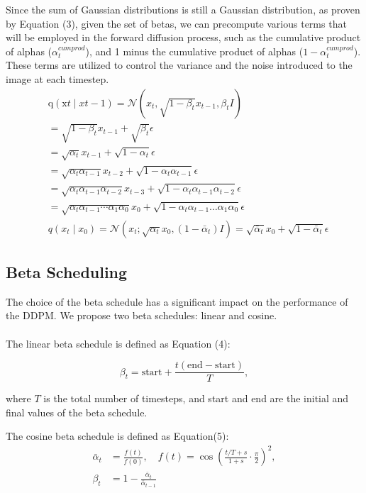 \documentclass[letterpaper]{article} %
\begin{document}
Since the sum of Gaussian distributions is still a Gaussian distribution, as proven by Equation (3), given the set of betas, we can precompute various terms that will be employed in the forward diffusion process, such as the cumulative product of alphas ($\alpha^{cumprod}_t$), and 1 minus the cumulative product of alphas ($1-\alpha^{cumprod}_t$). These terms are utilized to control the variance and the noise introduced to the image at each timestep.
\begin{equation}
\begin{aligned}
& \mathrm{q}\left(\mathrm{x}t \mid x{t-1}\right)=\mathcal{N}\left(x_t, \sqrt{1-\beta_t} x_{t-1}, \beta_t I\right) \\
& =\sqrt{1-\beta_t} x_{t-1}+\sqrt{\beta_t} \epsilon \\
& =\sqrt{\alpha_t} x_{t-1}+\sqrt{1-\alpha_t} \epsilon \\
& =\sqrt{\alpha_t \alpha_{t-1}} x_{t-2}+\sqrt{1-\alpha_t \alpha_{t-1}} \epsilon \\
& =\sqrt{\alpha_t \alpha_{t-1} \alpha_{t-2}} x_{t-3}+\sqrt{1-\alpha_t \alpha_{t-1} \alpha_{t-2}} \epsilon \\
& =\sqrt{\alpha_t \alpha_{t-1} \cdots \alpha_1 \alpha_0} x_0+\sqrt{1-\alpha_t \alpha_{t-1} \ldots \alpha_1 \alpha_0} \epsilon \\
& q\left(x_t \mid x_0\right)=\mathcal{N}\left(x_t ; \sqrt{\alpha_t} x_0,\left(1-\bar{\alpha}_t\right) I\right) =\sqrt{\bar{\alpha}_t} x_0+\sqrt{1-\bar{\alpha}_t} \epsilon
\end{aligned}
\end{equation}

\subsection{Beta Scheduling}
The choice of the beta schedule has a significant impact on the performance of the DDPM. We propose two beta schedules: linear and cosine. \\\\
The linear beta schedule is defined as Equation (4):

\begin{equation}
\beta_t = \text{start} + \frac{t (\text{end} - \text{start})}{T},
\end{equation}

\noindent where $T$ is the total number of timesteps, and start and end are the initial and final values of the beta schedule.

\noindent The cosine beta schedule is defined as Equation(5):
\begin{equation}
\begin{aligned}
\bar{\alpha}_t &= \frac{f(t)}{f(0)}, \quad f(t) = \cos \left(\frac{t / T+s}{1+s} \cdot \frac{\pi}{2}\right)^2, \\
\beta_t &= 1-\frac{\bar{\alpha}_t}{\bar{\alpha}_{t-1}} \qquad
\end{aligned}
\end{equation}
\end{document}
